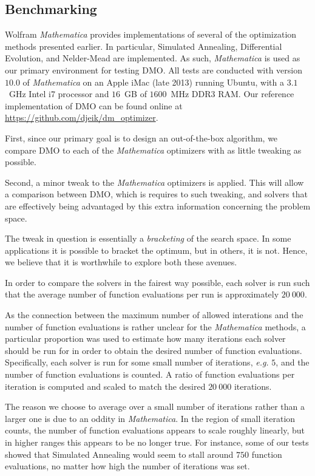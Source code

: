 \documentclass[12pt]{article}
\begin{document}
\subsection{Benchmarking}

Wolfram \emph{Mathematica} provides implementations of several of the
optimization methods presented earlier.
In particular, Simulated Annealing, Differential Evolution, and Nelder-Mead
are implemented.
As such, \emph{Mathematica} is used as our primary environment for testing
DMO.
All tests are conducted with version $10.0$ of \emph{Mathematica} on an
Apple iMac (late 2013) running Ubuntu, with a $3.1$~GHz Intel i7 processor
and $16$~GB of $1600$~MHz DDR3 RAM.
Our reference implementation of DMO can be found online at
\url{https://github.com/djeik/dm_optimizer}.

First, since our primary goal is to design an out-of-the-box algorithm,
we compare DMO to each of the \emph{Mathematica} optimizers with as little
tweaking as possible.

Second, a minor tweak to the \emph{Mathematica} optimizers is applied. This
will allow a comparison between DMO, which is requires to such tweaking,
and solvers that are effectively being advantaged by this extra information
concerning the problem space.

The tweak in question is essentially a \emph{bracketing} of the search
space. In some applications it is possible to bracket the optimum, but in
others, it is not. Hence, we believe that it is worthwhile to explore both
these avenues.

In order to compare the solvers in the fairest way possible, each solver is
run such that the average number of function evaluations per run is
approximately $20~000$.

As the connection between the maximum number of allowed interations and the
number of function evaluations is rather unclear for the \emph{Mathematica}
methods, a particular proportion was used to estimate how many iterations
each solver should be run for in order to obtain the desired number of
function evaluations.
Specifically, each solver is run for some small number of iterations,
\emph{e.g.} $5$, and the number of function evaluations is counted.
A ratio of function evaluations per iteration is computed and scaled to
match the desired $20~000$ iterations.

The reason we choose to average over a small number of iterations rather
than a larger one is due to an oddity in \emph{Mathematica}.
In the region of small iteration counts, the number of function evaluations
appears to scale roughly linearly, but in higher ranges this appears to be
no longer true.
For instance, some of our tests showed that Simulated Annealing would seem
to stall around $750$ function evaluations, no matter how high the number
of iterations was set.
\end{document}
